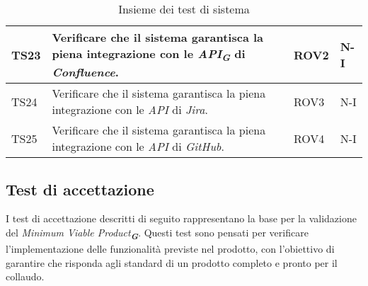 \begin{table}[h!]
\begin{tabularx}{\textwidth}{|p{}|X|p{}|p{}|}
    TS23 & Verificare che il sistema garantisca la piena integrazione con le \emph{API}\textsubscript{\textit{\textbf{G}}} di \emph{Confluence}. & ROV2 & N-I \\ \hline
    TS24 & Verificare che il sistema garantisca la piena integrazione con le \emph{API} di \emph{Jira}. & ROV3 & N-I \\ \hline
    TS25 & Verificare che il sistema garantisca la piena integrazione con le \emph{API} di \emph{GitHub}. & ROV4 & N-I \\ \hline
    \end{tabularx}
    \caption{Insieme dei test di sistema}
\end{table}
\newpage


\subsection{Test di accettazione}
\label{sec:Test di accettazione}
I test di accettazione descritti di seguito rappresentano la base per la validazione del \emph{Minimum Viable Product}\textsubscript{\textit{\textbf{G}}}. 
Questi test sono pensati per verificare l’implementazione delle funzionalità previste nel prodotto, 
con l’obiettivo di garantire che risponda agli standard di un prodotto completo e pronto per il collaudo.

